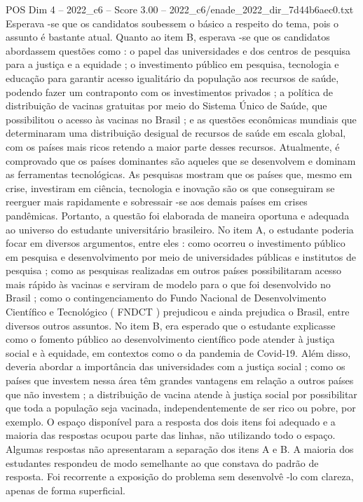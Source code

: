 \begin{textsample}{POS Dim 4 – 2022\_c6 – Score 3.00 – 2022\_c6/enade\_2022\_dir\_7d44b6aec0.txt}
Esperava -se que os candidatos soubessem o básico a respeito do tema, pois o assunto é bastante atual.
Quanto ao item B, esperava -se que os candidatos abordassem questões como : o papel das universidades e dos centros de pesquisa para a justiça e a equidade ; o investimento público em pesquisa, tecnologia e educação para garantir acesso igualitário da população aos recursos de saúde, podendo fazer um contraponto com os investimentos privados ; a política de distribuição de vacinas gratuitas por meio do Sistema Único de Saúde, que possibilitou o acesso às vacinas no Brasil ; e as questões econômicas mundiais que determinaram uma distribuição desigual de recursos de saúde em escala global, com os países mais ricos retendo a maior parte desses recursos.
Atualmente, é comprovado que os países dominantes são aqueles que se desenvolvem e dominam as ferramentas tecnológicas.
As pesquisas mostram que os países que, mesmo em crise, investiram em ciência, tecnologia e inovação são os que conseguiram se reerguer mais rapidamente e sobressair -se aos demais países em crises pandêmicas.
Portanto, a questão foi elaborada de maneira oportuna e adequada ao universo do estudante universitário brasileiro.
No item A, o estudante poderia focar em diversos argumentos, entre eles : como ocorreu o investimento público em pesquisa e desenvolvimento por meio de universidades públicas e institutos de pesquisa ; como as pesquisas realizadas em outros países possibilitaram acesso mais rápido às vacinas e serviram de modelo para o que foi desenvolvido no Brasil ; como o contingenciamento do Fundo Nacional de Desenvolvimento Científico e Tecnológico ( FNDCT ) prejudicou e ainda prejudica o Brasil, entre diversos outros assuntos.
No item B, era esperado que o estudante explicasse como o fomento público ao desenvolvimento científico pode atender à justiça social e à equidade, em contextos como o da pandemia de Covid-19.
Além disso, deveria abordar a importância das universidades com a justiça social ; como os países que investem nessa área têm grandes vantagens em relação a outros países que não investem ; a distribuição de vacina atende à justiça social por possibilitar que toda a população seja vacinada, independentemente de ser rico ou pobre, por exemplo.
O espaço disponível para a resposta dos dois itens foi adequado e a maioria das respostas ocupou parte das linhas, não utilizando todo o espaço.
Algumas respostas não apresentaram a separação dos itens A e B.
A maioria dos estudantes respondeu de modo semelhante ao que constava do padrão de resposta.
Foi recorrente a exposição do problema sem desenvolvê -lo com clareza, apenas de forma superficial.

\end{textsample}
